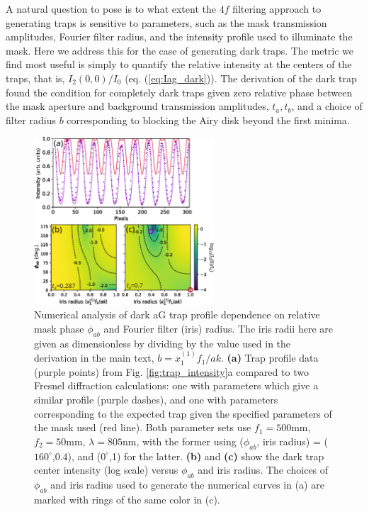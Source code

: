 A natural question to pose is to what extent the $4f$ filtering approach to generating traps is sensitive to parameters, such as the mask transmission amplitudes, Fourier filter radius, and the intensity profile used to illuminate the mask. Here we address this for the case of generating dark traps. The metric we find most useful is simply to quantify the relative intensity at the centers of the traps, that is, $I_2(0,0)/I_0$ (eq. (\ref{eq:Iag_dark})). The derivation of the dark trap found the condition for completely dark traps given zero relative phase between the mask aperture and background transmission amplitudes, $t_a,t_b$, and a choice of filter radius $b$ corresponding to blocking the Airy disk beyond the first minima. 
\begin{figure}[!ht]
    \centering
    \includegraphics[width=0.6\textwidth]{Images/figure5.eps}
    \caption{Numerical analysis of dark aG trap profile dependence on relative mask phase $\phi_{ab}$ and Fourier filter (iris) radius. The iris radii here are given as dimensionless by dividing by the value used in the derivation in the main text, $b=x^{(1)}_1 f_1/a k$. \textbf{(a)} Trap profile data (purple points) from Fig. \ref{fig:trap_intensity}a compared to two Fresnel diffraction calculations: one with parameters which give a similar profile (purple dashes), and one with parameters corresponding to the expected trap given the specified parameters of the mask used (red line). Both parameter sets  use $f_1=500$mm,$f_2=50$mm, $\lambda=805$nm, with the former using ($\phi_{ab}$, iris radius) = ($160^{\circ}$,0.4), and ($0^{\circ}$,1) for the latter. \textbf{(b)} and \textbf{(c)} show the dark trap center intensity (log scale) versus $\phi_{ab}$ and iris radius. The choices of $\phi_{ab}$ and iris radius used to generate the numerical curves in (a) are marked with rings of the same color in (c).}
    \label{fig:idark_vs_phi_b}
\end{figure}

